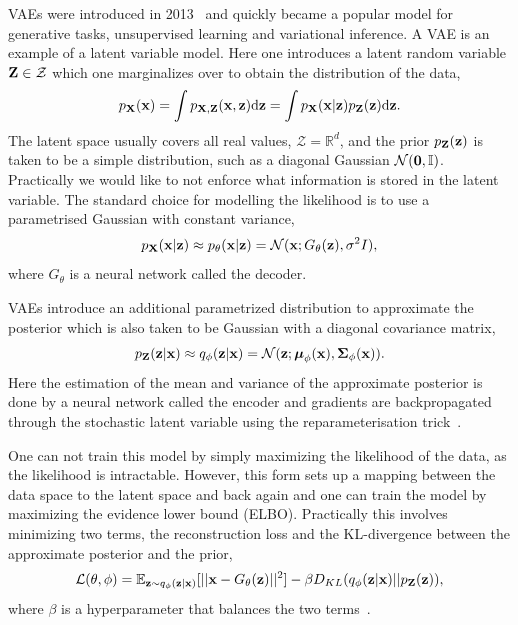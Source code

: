 VAEs were introduced in 2013~\cite{AutoEncodingVariationalBayes} and quickly became a popular model for generative tasks, unsupervised learning and variational inference.
A VAE is an example of a latent variable model.
Here one introduces a latent random variable $\mathbf{Z} \in \mathcal{Z}$ which one marginalizes over to obtain the distribution of the data,
\begin{equation}
    p_{\mathbf{X}}(\mathbf{x}) = \int p_{\mathbf{X},\mathbf{Z}}(\mathbf{x}, \mathbf{z})\mathrm{d}\mathbf{z} = \int p_{\mathbf{X}}(\mathbf{x}|\mathbf{z})p_{\mathbf{Z}}(\mathbf{z})\mathrm{d}\mathbf{z}.
\end{equation}
The latent space usually covers all real values, $\mathcal{Z} = \mathbb{R}^d$, and the prior $p_{\mathbf{Z}}(\mathbf{z})$ is taken to be a simple distribution, such as a diagonal Gaussian $\mathcal{N}(\mathbf{0}, \mathbb{I})$.
Practically we would like to not enforce what information is stored in the latent variable.
The standard choice for modelling the likelihood is to use a parametrised Gaussian with constant variance,
\begin{equation}
    p_{\mathbf{X}}(\mathbf{x}|\mathbf{z}) \approx p_{\theta}(\mathbf{x}|\mathbf{z}) = \mathcal{N}(\mathbf{x}; G_{\theta}(\mathbf{z}), \sigma^2 I),
\end{equation}
where $G_{\theta}$ is a neural network called the decoder.

VAEs introduce an additional parametrized distribution to approximate the posterior which is also taken to be Gaussian with a diagonal covariance matrix,
\begin{equation}
    p_{\mathbf{Z}}(\mathbf{z}|\mathbf{x}) \approx q_\phi(\mathbf{z}|\mathbf{x}) = \mathcal{N}(\mathbf{z}; \boldsymbol{\mu}_\phi(\mathbf{x}), \boldsymbol{\Sigma}_\phi(\mathbf{x})).
\end{equation}
Here the estimation of the mean and variance of the approximate posterior is done by a neural network called the encoder and gradients are backpropagated through the stochastic latent variable using the reparameterisation trick~\cite{AutoEncodingVariationalBayes}.

One can not train this model by simply maximizing the likelihood of the data, as the likelihood is intractable.
However, this form sets up a mapping between the data space to the latent space and back again and one can train the model by maximizing the evidence lower bound (ELBO).
Practically this involves minimizing two terms, the reconstruction loss and the KL-divergence between the approximate posterior and the prior,
\begin{equation}
        \mathcal{L}(\theta, \phi) = \mathbb{E}_{\mathbf{z} \sim q_{\phi}(\mathbf{z}|\mathbf{x})}[||\mathbf{x} - G_{\theta}(\mathbf{z})||^2] - \beta D_{KL}(q_{\phi}(\mathbf{z}|\mathbf{x}) || p_{\mathbf{Z}}(\mathbf{z})),
\end{equation}
where $\beta$ is a hyperparameter that balances the two terms~\cite{BetaVAE}.

